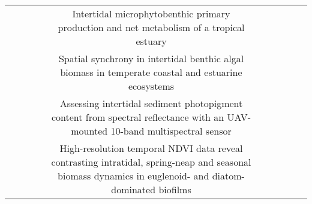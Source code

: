 \documentclass[
  letterpaper,
  DIV=11,
  numbers=noendperiod]{scrartcl}
\begin{document}
\begin{table}[]
\begin{tabular}{|cccc|ccc|ccc|}
\multicolumn{1}{|c|}{}                                       & \multicolumn{1}{c|}{}                                    & \multicolumn{1}{c|}{}                                       &                                     & \multicolumn{1}{c|}{Intertidal microphytobenthic primary production and net   metabolism of a tropical estuary}                                                                                                           & \multicolumn{1}{c|}{}                             &         & \multicolumn{1}{c|}{}                          & \multicolumn{1}{c|}{}                          & \cellcolor[HTML]{F2F2F2} \\ \cline{5-10} 
\multicolumn{1}{|c|}{}                                       & \multicolumn{1}{c|}{}                                    & \multicolumn{1}{c|}{}                                       &                                     & \multicolumn{1}{c|}{Spatial synchrony in intertidal benthic algal biomass in   temperate coastal and estuarine ecosystems}                                                                                                & \multicolumn{1}{c|}{}                             &         & \multicolumn{1}{c|}{}                          & \multicolumn{1}{c|}{}                          & \cellcolor[HTML]{F2F2F2} \\ \cline{5-10} 
\multicolumn{1}{|c|}{}                                       & \multicolumn{1}{c|}{}                                    & \multicolumn{1}{c|}{}                                       &                                     & \multicolumn{1}{c|}{Assessing intertidal sediment photopigment content from spectral   reflectance with an UAV-mounted 10-band multispectral sensor}                                                                      & \multicolumn{1}{c|}{}                             &         & \multicolumn{1}{c|}{}                          & \multicolumn{1}{c|}{}                          & \cellcolor[HTML]{F2F2F2} \\ \cline{5-10} 
\multicolumn{1}{|c|}{}                                       & \multicolumn{1}{c|}{}                                    & \multicolumn{1}{c|}{}                                       &                                     & \multicolumn{1}{c|}{High-resolution temporal NDVI data reveal contrasting   intratidal, spring-neap and seasonal biomass dynamics in euglenoid- and   diatom-dominated biofilms}                                          & \multicolumn{1}{c|}{}                             &         & \multicolumn{1}{c|}{}                          & \multicolumn{1}{c|}{}                          & \cellcolor[HTML]{F2F2F2} \\ \cline{5-10} 

\end{tabular}
\end{table}
\end{document}

